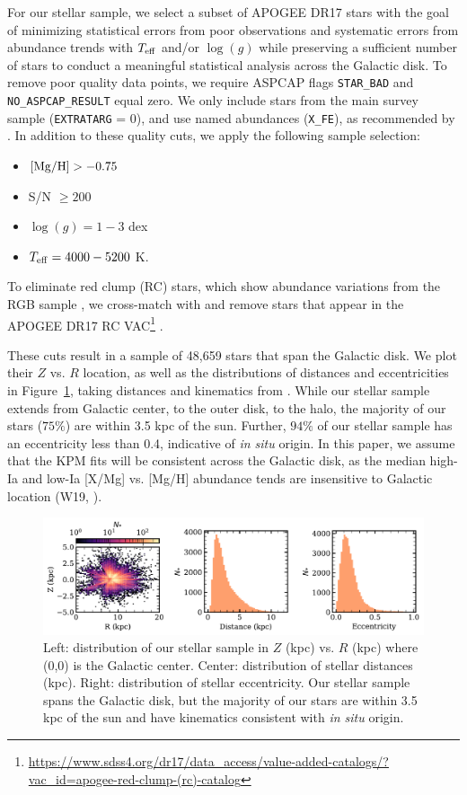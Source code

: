 \documentclass[modern]{aastex631}
\newcommand{\mgh}{[{\rm Mg}/{\rm H}]}
\newcommand{\logg}{\log(g)}
\newcommand{\teff}{T_{\rm eff}}
\begin{document}
For our stellar sample, we select a subset of APOGEE DR17 stars with the goal of minimizing statistical errors from poor observations and systematic errors from abundance trends with $\teff$ and/or $\logg$ while preserving a sufficient number of stars to conduct a meaningful statistical analysis across the Galactic disk. To remove poor quality data points, we require ASPCAP flags \texttt{STAR\_BAD} and \texttt{NO\_ASPCAP\_RESULT} equal zero. We only include stars from the main survey sample (\texttt{EXTRATARG} = 0), and use named abundances (\texttt{X\_FE}), as recommended by \citet{jonsson2020}. In addition to these quality cuts, we apply the following sample selection:
\begin{itemize}
\itemsep0em
    \item $\mgh > -0.75$
    \item S/N $\geq 200$
    \item $\logg = 1-3$ dex
    \item $\teff = 4000-5200$ K.
\end{itemize}
To eliminate red clump (RC) stars, which show abundance variations from the RGB sample \citep{vincenzo2021a}, we cross-match with and remove stars that appear in the APOGEE DR17 RC VAC\footnote{\url{https://www.sdss4.org/dr17/data_access/value-added-catalogs/?vac_id=apogee-red-clump-(rc)-catalog}} \citep{bovy2014}. 

These cuts result in a sample of 48,659 stars that span the Galactic disk. We plot their $Z$ vs. $R$ location, as well as the distributions of distances and eccentricities in Figure~\ref{fig:star_dist}, taking distances and kinematics from \citep{queiroz2023}. While our stellar sample extends from Galactic center, to the outer disk, to the halo, the majority of our stars ($75\%$) are within 3.5 kpc of the sun. Further, $94\%$ of our stellar sample has an eccentricity less than 0.4, indicative of \textit{in situ} origin. In this paper, we assume that the KPM fits will be consistent across the Galactic disk, as the median high-Ia and low-Ia [X/Mg] vs. [Mg/H] abundance tends are insensitive to Galactic location (W19, \citealp{griffith2021a}).  
\begin{figure}[htb!]
    \centering
    \includegraphics[width=\textwidth]{Paper/Figures/star_sample.pdf}
    \caption{Left: distribution of our stellar sample in $Z$ (kpc) vs. $R$ (kpc) where (0,0) is the Galactic center. Center: distribution of stellar distances (kpc). Right: distribution of stellar eccentricity. Our stellar sample spans the Galactic disk, but the majority of our stars are within 3.5 kpc of the sun and have kinematics consistent with \textit{in situ} origin.}
    \label{fig:star_dist}
\end{figure}
\end{document}
